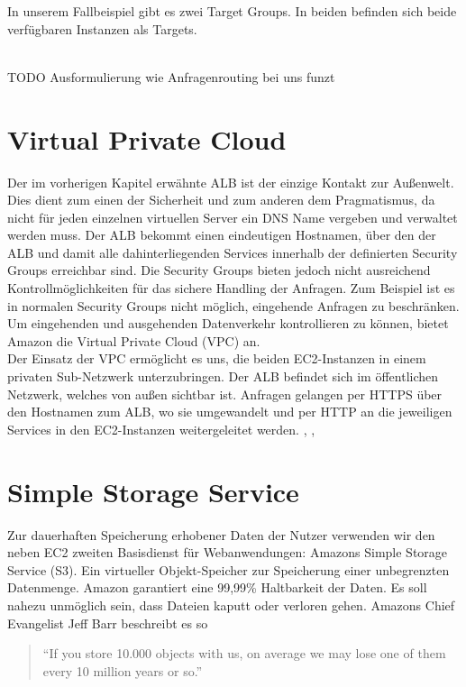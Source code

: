 In unserem Fallbeispiel gibt es zwei Target Groups. In beiden befinden sich beide verfügbaren Instanzen als Targets.

\\ TODO Ausformulierung wie Anfragenrouting bei uns funzt


\section{Virtual Private Cloud}
\label{sec:vpc}
Der im vorherigen Kapitel erwähnte ALB ist der einzige Kontakt zur Außenwelt. Dies dient zum einen der Sicherheit und zum anderen dem Pragmatismus, da nicht für jeden einzelnen virtuellen Server ein DNS Name vergeben und verwaltet werden muss. Der ALB bekommt einen eindeutigen Hostnamen, über den der ALB und damit alle dahinterliegenden Services innerhalb der definierten Security Groups erreichbar sind. Die Security Groups bieten jedoch nicht ausreichend Kontrollmöglichkeiten für das sichere Handling der Anfragen. Zum Beispiel ist es in normalen Security Groups nicht möglich, eingehende Anfragen zu beschränken. Um eingehenden und ausgehenden Datenverkehr kontrollieren zu können, bietet Amazon die Virtual Private Cloud (VPC) an. \\
Der Einsatz der VPC ermöglicht es uns, die beiden EC2-Instanzen in einem privaten Sub-Netzwerk unterzubringen. Der ALB befindet sich im öffentlichen Netzwerk, welches von außen sichtbar ist. Anfragen gelangen per HTTPS über den Hostnamen zum ALB, wo sie umgewandelt und per HTTP an die jeweiligen Services in den EC2-Instanzen weitergeleitet werden.
\cite{vliet:resilience}, \cite{wittig:awsinaction}, \cite{aws:vpc}

\section{Simple Storage Service}
\label{sec:s3}
Zur dauerhaften Speicherung erhobener Daten der Nutzer verwenden wir den neben EC2 zweiten Basisdienst für Webanwendungen: Amazons Simple Storage Service (S3). Ein virtueller Objekt-Speicher zur Speicherung einer unbegrenzten Datenmenge. Amazon garantiert eine 99,99\% Haltbarkeit der Daten. Es soll nahezu unmöglich sein, dass Dateien kaputt oder verloren gehen. Amazons Chief Evangelist Jeff Barr beschreibt es so \\
\begin{quote}
"`If you store 10.000 objects with us, on average we may lose one of them every 10 million years or so."'
\end{quote} \cite{vliet:programmingec2}

